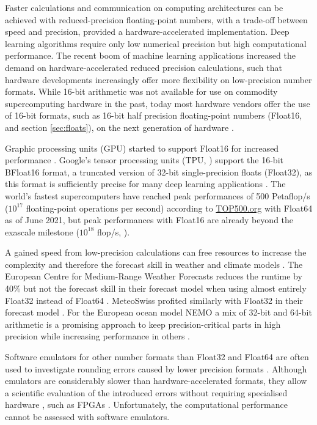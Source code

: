 Faster calculations and communication on computing architectures can be achieved with reduced-precision floating-point numbers,
with a trade-off between speed and precision, provided a hardware-accelerated implementation. Deep learning algorithms require
only low numerical precision \citep{Wang2018,Sun2020} but high computational performance. The recent boom of machine learning
applications increased the demand on hardware-accelerated reduced precision calculations, such that hardware developments
increasingly offer more flexibility on low-precision number formats. While 16-bit arithmetic was not available for use on commodity
supercomputing hardware in the past, today most hardware vendors offer the use of 16-bit formats, such as 16-bit half precision
floating-point numbers (Float16, \cite{IEEE2008} and section \ref{sec:floats}), on the next generation of hardware
\citep{Sato2020,Burgess2019}.

Graphic processing units (GPU) started to support Float16 for increased performance \citep{Markidis2018}. Google's tensor processing
units (TPU, \cite{Jouppi2017,Jouppi2018}) support the 16-bit BFloat16 format, a truncated version of 32-bit single-precision floats (Float32),
as this format is sufficiently precise for many deep learning applications \citep{Kalamkar2019,Burgess2019,Gupta2015}. The world's fastest
supercomputers have reached peak performances of 500 Petaflop/s ($10^{17}$
floating-point operations per second) according to \href{https://top500.org}{TOP500.org} \citep{Dongarra2011} with Float64 as of June 2021,
but peak performances with Float16 are already beyond the exascale milestone ($10^{18}$ flop/s, \cite{Kurth2018,Kudo2020a}).

A gained speed from low-precision calculations can free resources to increase the complexity and therefore the forecast skill in
weather and climate models \citep{Bauer2020}. The European Centre for Medium-Range Weather Forecasts reduces the runtime by
40\% but not the forecast skill in their forecast model when using almost entirely Float32 instead of Float64 \citep{Vana2017}. MeteoSwiss
profited similarly with Float32 in their forecast model \citep{Rudisuhli2013,Fuhrer2018}. For the European ocean model NEMO
\citep{Madec2017} a mix of 32-bit and 64-bit arithmetic is a promising approach to keep precision-critical parts in high precision while
increasing performance in others \citep{TintoPrims2019}.

Software emulators for other number formats than Float32 and Float64 are often used to investigate rounding errors caused by lower
precision formats \citep{Dawson2017}. Although emulators are considerably slower than hardware-accelerated formats, they allow a
scientific evaluation of the introduced errors without requiring specialised hardware \citep{Johnson2020}, such as FPGAs
\citep{Russell2017}. Unfortunately, the computational performance cannot be assessed with software emulators.

